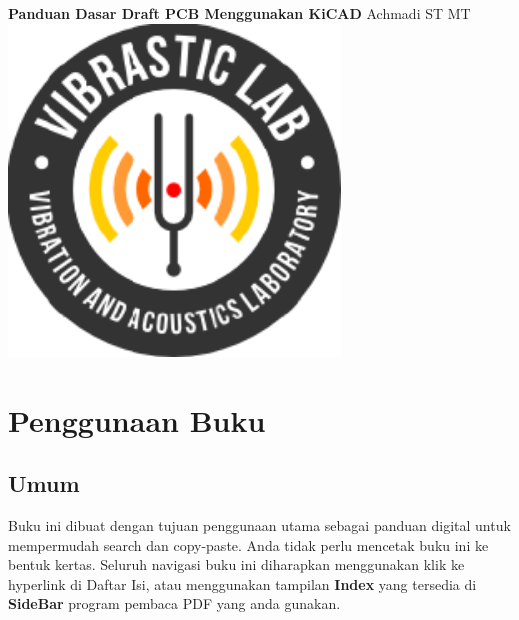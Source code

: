 \documentclass[12pt]{book}
\date{}
\begin{document}
	\frontmatter
	\begin{titlepage}
		\centering
		{\LARGE \bf Panduan Dasar Draft PCB Menggunakan KiCAD}
		\vfill
		{\Large Achmadi ST MT}
		\vfill
		\includegraphics[width=250pt]{images/logo/logoviblab}
		\vfill
		\vfill
	\end{titlepage}


	\newpage
	\tableofcontents
	\listoffigures
	\listoftables



	\newpage
	\chapter{Penggunaan Buku}

	\section{Umum}
	Buku ini dibuat dengan tujuan penggunaan utama sebagai panduan digital untuk mempermudah search dan copy-paste.
	Anda tidak perlu mencetak buku ini ke bentuk kertas.
	Seluruh navigasi buku ini diharapkan menggunakan klik ke hyperlink di Daftar Isi,
	atau menggunakan tampilan \textbf{Index} yang tersedia di \textbf{SideBar} program pembaca PDF yang anda gunakan.
\end{document}
